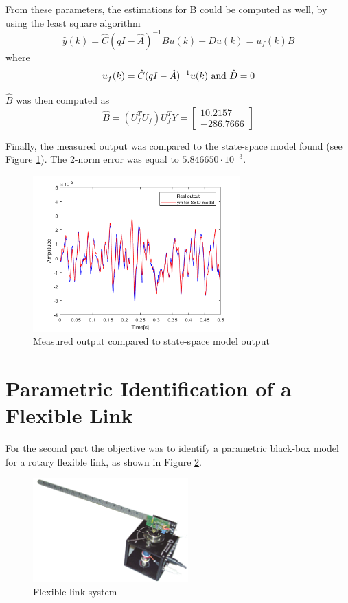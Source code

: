 \documentclass[a4paper,11pt]{article}
\begin{document}
From these parameters, the estimations for B could be computed as well, by using the least square algorithm 
\begin{equation}
\hat{y}(k)=\hat{C}(qI-\hat{A})^{-1}Bu(k)+Du(k)=u_f(k)B
\end{equation}
where
\begin{equation}
u_f(k)=\hat{C}(qI-\hat{A})^{-1}u(k) ~\textnormal{and}~\hat{D}=0
\end{equation}

$\hat{B}$ was then computed as
\begin{equation}
\hat{B}= (U_f^TU_f)U_f^TY=\begin{bmatrix}
10.2157\\
 -286.7666
\end{bmatrix}
\end{equation}

Finally, the measured output was compared to the state-space model found (see Figure \ref{fig:ym_SSID}). The 2-norm error was equal to $5.846650\cdot10^{-3}$.

\begin{figure}[H]
\centering
\includegraphics[height = 6cm]{images/ym_SSID}
\caption{Measured output compared to state-space model output}
\label{fig:ym_SSID}
\end{figure}


\section{Parametric Identification of a Flexible Link}

For the second part the objective was to identify a parametric black-box model for a rotary flexible link, as shown in Figure \ref{fig:syst}.

\begin{figure}[H]
\centering
\includegraphics[height = 4cm]{images/system}
\caption{Flexible link system}
\label{fig:syst}
\end{figure}
\end{document}

